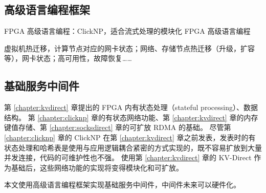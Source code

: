 \subsection{高级语言编程框架}

FPGA 高级语言编程：ClickNP，适合流式处理的模块化 FPGA 高级语言编程

虚拟机热迁移，计算节点对应的网卡状态；网络、存储节点热迁移（升级，扩容等），网卡状态；高可用性，故障恢复……

\subsection{基础服务中间件}



第 \ref{chapter:kvdirect} 章提出的 FPGA 内有状态处理（stateful processing）、数据结构。
第 \ref{chapter:clicknp} 章的有状态网络功能、第 \ref{chapter:kvdirect} 章的内存键值存储、第 \ref{chapter:socksdirect} 章的可扩放 RDMA 的基础。
尽管第 \ref{chapter:clicknp} 章的 ClickNP 在第 \ref{chapter:kvdirect} 章之前发表，发表时的有状态处理和哈希表是使用与应用逻辑耦合紧密的方式实现的，既不容易扩放到大量并发连接，代码的可维护性也不强。
使用第 \ref{chapter:kvdirect} 章的 KV-Direct 作为基础后，这些网络功能的实现将变得模块化和可扩放。

本文使用高级语言编程框架实现基础服务中间件，中间件未来可以硬件化。
